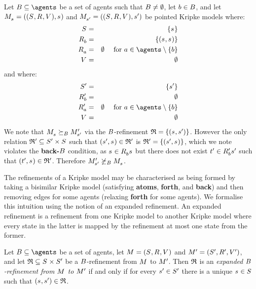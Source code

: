 \begin{example}
Let $\agentsB \subseteq \agents$ be a set of agents such that $B \neq \emptyset$, let $b \in B$, and let $\kPModelAndTuple{\kStateS}$ and $\kPModelAndTuple{\kStateSP}$ be pointed Kripke models where:
\begin{eqnarray*}
    \kStates &=& \{\kStateS\}\\
    \kAccessibilityB &=& \{(\kStateS, \kStateS)\}\\
    \kAccessibilityA &=& \emptyset \quad \text{ for } \agentA \in \agents \setminus \{\agentB\}\\
    \kValuation &=& \emptyset
\end{eqnarray*}
and where:
\begin{eqnarray*}
    \kStatesP &=& \{\kStateSP\}\\
    \kAccessibilityPB &=& \emptyset\\
    \kAccessibilityPA &=& \emptyset \quad \text{ for } \agentA \in \agents \setminus \{\agentB\}\\
    \kValuation &=& \emptyset\\
\end{eqnarray*}
We note that $\kPModel{\kStateS} \simulatesBs \kPModelP{\kStateSP}$ via the $B$-refinement $\refinement = \{(\kStateS, \kStateSP)\}$.
However the only relation $\refinement' \subseteq \kStatesP \times \kStates$ such that $(\kStateSP, \kStateS) \in \refinement'$ is $\refinement' = \{(\kStateSP, \kStateS)\}$, which we note violates the {\bf back-$B$} condition, as $\kStateS \in \kAccessibilityB{\kStateS}$ but there does not exist ${t}^{\prime} \in {R^{\prime}_{b}}{{s}^{\prime}}$ such that $(\kStateTP, \kStateS) \in \refinement'$.
Therefore $\kPModelP{\kStateSP} \not\simulatesBs \kPModel{\kStateS}$.
\end{example}

The refinements of a Kripke model may be characterised as being formed by taking a bisimilar Kripke model (satisfying {\bf atoms}, {\bf forth}, and {\bf back}) and then removing edges for some agents (relaxing {\bf forth} for some agents).
We formalise this intuition using the notion of an expanded refinement.
An expanded refinement is a refinement from one Kripke model to another Kripke model where every state in the latter is mapped by the refinement at most one state from the former.

\begin{definition}\label{expanded-refinement}
Let $\agentsB \subseteq \agents$ be a set of agents, let $\kModelAndTuple$ and $\kModelAndTupleP$, and let $\refinement \subseteq \kStates \times \kStatesP$ be a $B$-refinement from $\kModel$ to ${M^{\prime}_{}}$.
Then $\mathfrak{R}$ is an {\em expanded $B$-refinement from $\kModel$ to ${M^{\prime}_{}}$} if and only if for every ${s}^{\prime} \in {S^{\prime}}$ there is a unique $\kStateS \in \kStates$ such that $(\kStateS, \kStateSP) \in \refinement$.
\end{definition}

